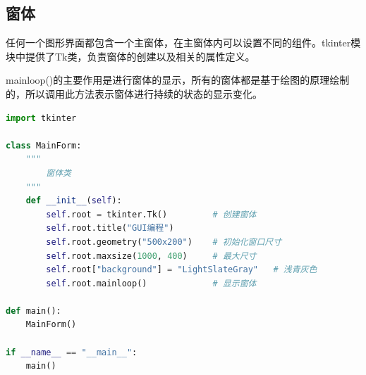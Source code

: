 \vspace{0.5cm}

\subsection{窗体}

任何一个图形界面都包含一个主窗体，在主窗体内可以设置不同的组件。tkinter模块中提供了Tk类，负责窗体的创建以及相关的属性定义。\\

\begin{table}[H]
	\centering
	\caption{Tk类}
\end{table}

mainloop()的主要作用是进行窗体的显示，所有的窗体都是基于绘图的原理绘制的，所以调用此方法表示窗体进行持续的状态的显示变化。\\


\begin{lstlisting}[language=Python]
import tkinter

class MainForm:
    """
        窗体类
    """
    def __init__(self):
        self.root = tkinter.Tk()         # 创建窗体
        self.root.title("GUI编程")
        self.root.geometry("500x200")    # 初始化窗口尺寸
        self.root.maxsize(1000, 400)     # 最大尺寸
        self.root["background"] = "LightSlateGray"   # 浅青灰色
        self.root.mainloop()             # 显示窗体

def main():
    MainForm()

if __name__ == "__main__":
    main()
\end{lstlisting}

